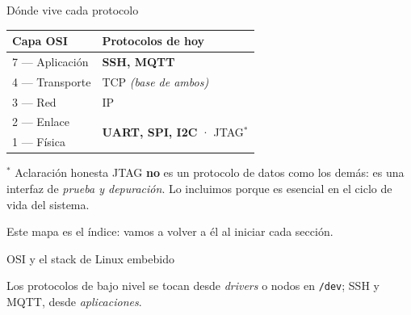 \documentclass[aspectratio=169,11pt]{beamer}
\begin{document}
\begin{frame}{Dónde vive cada protocolo}
\begin{center}
\begin{tabular}{@{}ll@{}}
\toprule
\textbf{Capa OSI} & \textbf{Protocolos de hoy} \\
\midrule
7 — Aplicación & {\color{acero}\textbf{SSH, MQTT}} \\
4 — Transporte & TCP \emph{(base de ambos)} \\
3 — Red & IP \\
2 — Enlace & \multirow{2}{*}{{\color{cobre}\textbf{UART, SPI, I2C}}\; · \; JTAG$^{*}$} \\
1 — Física & \\
\bottomrule
\end{tabular}
\end{center}

\vspace{0.6em}
\begin{alertblock}{$^{*}$ Aclaración honesta}
JTAG \textbf{no} es un protocolo de datos como los demás: es una interfaz de \emph{prueba y depuración}. Lo incluimos porque es esencial en el ciclo de vida del sistema.
\end{alertblock}

\vspace{0.3em}
{\footnotesize Este mapa es el índice: vamos a volver a él al iniciar cada sección.}
\end{frame}

\begin{frame}{OSI y el stack de Linux embebido}
\begin{center}
\end{center}
\vspace{0.4em}
{\footnotesize Los protocolos de bajo nivel se tocan desde \emph{drivers} o nodos en \texttt{/dev}; SSH y MQTT, desde \emph{aplicaciones}.}
\end{frame}
\end{document}
